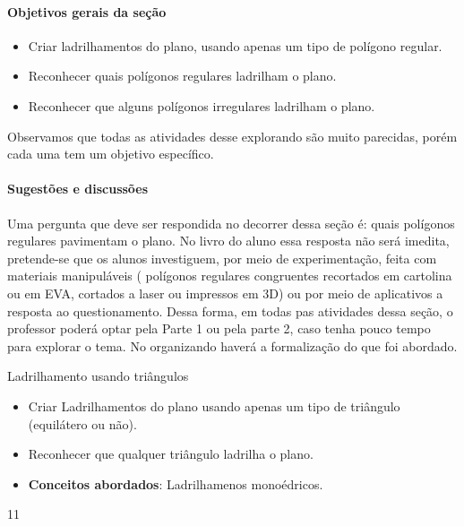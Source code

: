 \clearpage
\def\currentcolor{session1}
\begin{texto}
{
	\paragraph {Objetivos gerais da seção}
	\begin{itemize}
	\item Criar ladrilhamentos do plano, usando apenas um tipo de polígono regular.
	\item Reconhecer quais polígonos regulares ladrilham o plano.
	\item Reconhecer que alguns polígonos irregulares ladrilham o plano.
	\end{itemize}


	Observamos que todas as atividades desse explorando são muito parecidas, porém cada uma tem um objetivo específico.

	\paragraph {Sugestões e discussões}

	Uma pergunta que deve ser respondida no decorrer dessa seção é: quais polígonos regulares pavimentam o plano. No livro do aluno essa resposta não será imedita, pretende-se que os alunos investiguem, por meio de experimentação, feita com materiais manipuláveis ( polígonos regulares congruentes recortados em cartolina ou em EVA, cortados a laser ou impressos em 3D) ou por meio de aplicativos a resposta ao questionamento. Dessa forma, em todas pas atividades dessa seção, o professor poderá optar pela Parte 1 ou pela parte 2, caso tenha pouco tempo para explorar o tema. No organizando haverá a formalização do que foi abordado.  
}
\end{texto}
\begin{objectives}{Ladrilhamento usando triângulos}
{
	\begin{itemize}
	\item Criar Ladrilhamentos do plano usando apenas um tipo de triângulo (equilátero ou não).
	\item Reconhecer que qualquer triângulo ladrilha o plano.
	\item \textbf{Conceitos abordados}: Ladrilhamenos monoédricos.
	\end{itemize}
}{1}{1}
\end{objectives}
